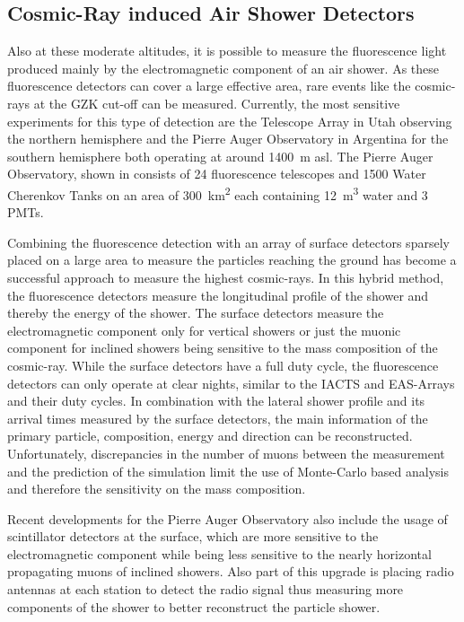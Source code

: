 \subsection{Cosmic-Ray induced Air Shower Detectors}

Also at these moderate altitudes, it is possible to measure the fluorescence light produced mainly by the electromagnetic component of an air shower.
As these fluorescence detectors can cover a large effective area, rare events like the cosmic-rays at the GZK cut-off can be measured.
Currently, the most sensitive experiments for this type of detection are the Telescope Array \cite{TA12FD, TA13SD} in Utah observing the northern hemisphere and the Pierre Auger Observatory \cite{Auger15} in Argentina for the southern hemisphere both operating at around \SI{1400}{m} asl.
The Pierre Auger Observatory, shown in  consists of 24 fluorescence telescopes and 1500 Water Cherenkov Tanks on an area of \SI{300}{\square\kilo\meter} each containing \SI{12}{\cubic\meter} water and 3 PMTs.

Combining the fluorescence detection with an array of surface detectors sparsely placed on a large area to measure the particles reaching the ground has become a successful approach to measure the highest cosmic-rays.
In this hybrid method, the fluorescence detectors measure the longitudinal profile of the shower and thereby the energy of the shower.
The surface detectors measure the electromagnetic component only for vertical showers or just the muonic component for inclined showers being sensitive to the mass composition of the cosmic-ray.
While the surface detectors have a full duty cycle, the fluorescence detectors can only operate at clear nights, similar to the IACTS and EAS-Arrays and their duty cycles.
In combination with the lateral shower profile and its arrival times measured by the surface detectors, the main information of the primary particle, composition, energy and direction can be reconstructed.
Unfortunately, discrepancies in the number of muons between the measurement and the prediction of the simulation limit the use of Monte-Carlo based analysis and therefore the sensitivity on the mass composition.

Recent developments for the Pierre Auger Observatory \cite{Auger16Prime, Castellina19Prime} also include the usage of scintillator detectors at the surface, which are more sensitive to the electromagnetic component while being less sensitive to the nearly horizontal propagating muons of inclined showers.
Also part of this upgrade is placing radio antennas at each station to detect the radio signal thus measuring more components of the shower to better reconstruct the particle shower.

